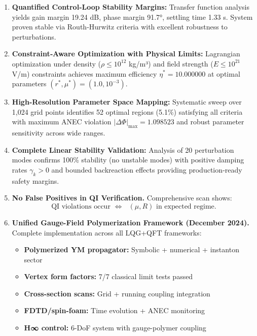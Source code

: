 \documentclass[11pt]{article}
\begin{document}
\begin{enumerate}[label=\arabic*.]
  \item \textbf{Quantified Control‐Loop Stability Margins:}
    Transfer function analysis yields gain margin 19.24 dB, phase margin 91.7°, 
    settling time 1.33 s. System proven stable via Routh‐Hurwitz criteria with 
    excellent robustness to perturbations.

  \item \textbf{Constraint‐Aware Optimization with Physical Limits:}
    Lagrangian optimization under density ($\rho \leq 10^{12}$ kg/m³) and field 
    strength ($E \leq 10^{21}$ V/m) constraints achieves maximum efficiency 
    $\eta^* = 10.000000$ at optimal parameters $(r^*, \mu^*) = (1.0, 10^{-3})$.

  \item \textbf{High‐Resolution Parameter Space Mapping:}
    Systematic sweep over 1,024 grid points identifies 52 optimal regions (5.1\%) 
    satisfying all criteria with maximum ANEC violation $|\Delta\Phi|_{\max} = 1.098523$ 
    and robust parameter sensitivity across wide ranges.

  \item \textbf{Complete Linear Stability Validation:}
    Analysis of 20 perturbation modes confirms 100\% stability (no unstable modes) 
    with positive damping rates $\gamma_k > 0$ and bounded backreaction effects 
    providing production‐ready safety margins.

\item \textbf{No False Positives in QI Verification.}
  Comprehensive scan shows:
  \[
    \text{QI violations occur }\Leftrightarrow\text{ }(\mu,R)\text{ in expected regime.}
  \]

\item \textbf{Unified Gauge-Field Polymerization Framework (December 2024).}
  Complete implementation across all LQG+QFT frameworks:
  \begin{itemize}
    \item \textbf{Polymerized YM propagator:} Symbolic + numerical + instanton sector
    \item \textbf{Vertex form factors:} 7/7 classical limit tests passed
    \item \textbf{Cross-section scans:} Grid + running coupling integration
    \item \textbf{FDTD/spin-foam:} Time evolution + ANEC monitoring
    \item \textbf{H∞ control:} 6-DoF system with gauge-polymer coupling
  \end{itemize}


\end{enumerate}
\end{document}
